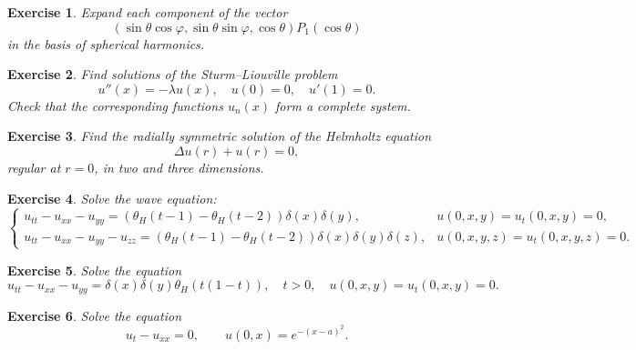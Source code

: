 \documentclass[11pt,a4paper]{article}
\newtheorem*{exercise}{Exercise}
\begin{document}
\begin{exercise}
	Expand each component of the vector
	\[
	(\sin\theta\cos\varphi, \sin\theta\sin\varphi, \cos\theta)P_1(\cos\theta)
	\]
	in the basis of spherical harmonics.
\end{exercise}

\begin{exercise}
	Find solutions of the Sturm–Liouville problem
	\[
	u''(x) = -\lambda u(x), \quad u(0) = 0, \quad u'(1) = 0.
	\]
	Check that the corresponding functions $u_n(x)$ form a complete system.
\end{exercise}

\begin{exercise}
	Find the radially symmetric solution of the Helmholtz equation
	\[
	\Delta u(r) + u(r) = 0,
	\]
	regular at $r = 0$, in two and three dimensions.
\end{exercise}
\begin{exercise}
	Solve the wave equation:
	\[
	\begin{cases}
		u_{tt} - u_{xx} - u_{yy} = (\theta_H(t - 1) - \theta_H(t - 2)) \delta(x)\delta(y), & u(0, x, y) = u_t(0, x, y) = 0, \\
		u_{tt} - u_{xx} - u_{yy} - u_{zz} = (\theta_H(t - 1) - \theta_H(t - 2)) \delta(x)\delta(y)\delta(z), & u(0, x, y, z) = u_t(0, x, y, z) = 0.
	\end{cases}
	\]
\end{exercise}
\begin{exercise}
	Solve the equation
	\[
	u_{tt} - u_{xx} - u_{yy} = \delta(x)\delta(y)\theta_H(t(1 - t)), \quad t > 0, \quad u(0, x, y) = u_t(0, x, y) = 0.
	\]
\end{exercise}
\begin{exercise}
	Solve the equation
	\[
	u_t - u_{xx} = 0, \qquad u(0, x) = e^{-(x - a)^2}.
	\]
\end{exercise}
\end{document}
